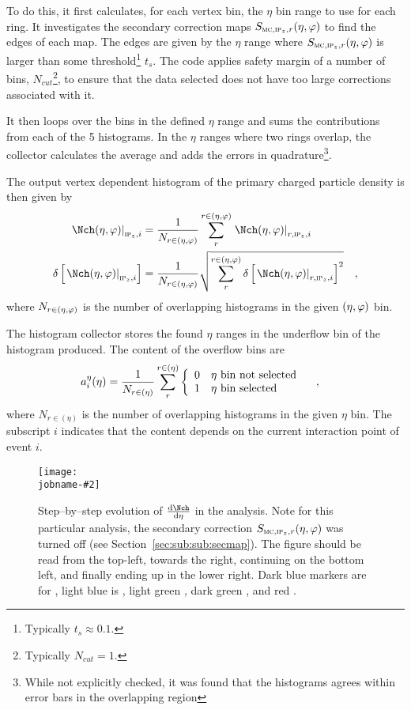 \documentclass[compat,11pt]{alicenote}
\newcommand*{\etaphi}{\ensuremath(\eta,\varphi)}
\newcommand*\SecMap{\ensuremath S_{\subMC,\subIPz,r}\etaphi}
\newcommand{\secref}[1]{Section~\ref{#1}}
\newcommand{\dndetadphi}[1][]{{\ensuremath%
    \ifx|#1|\else\left.\fi%
      \Nch\etaphi%
      \ifx|#1|\else\right|_{#1}\fi}}
\newcommand{\etaCov}{\ensuremath a_i^{\eta}(\eta)}
\newcommand\figinput[2][\textwidth]{%
  \texttt{[image: \\jobname-\#2]}}
\begin{document}
To do this, it first calculates, for each vertex bin, the $\eta$ bin
range to use for each ring.  It investigates the secondary correction
maps $\SecMap{}$ to find the edges of each map.  The edges are given
by the $\eta$ range where $\SecMap{}$ is larger than some
threshold\footnote{Typically $t_s\approx 0.1$.}  $t_s$. The code
applies safety margin of a number of bins,
$N_{cut}$\footnote{Typically $N_{cut}=1$.}, to ensure that the data
selected does not have too large corrections associated with it.

It then loops over the bins in the defined $\eta$ range and sums the
contributions from each of the 5 histograms.  In the $\eta$ ranges
where two rings overlap, the collector calculates the average and adds
the errors in quadrature\footnote{While not explicitly checked, it was
  found that the histograms agrees within error bars in the
  overlapping region}.

The output vertex dependent histogram of the primary
charged particle density is then given by
\begin{align}
  \label{eq:superhist}
  \dndetadphi[\subIPz,i] &=
  \frac{1}{N_{r\in\etaphi}}\sum_{r}^{r\in\etaphi}  
  \dndetadphi[r,\subIPz,i]\\
  \delta\left[\dndetadphi[\subIPz,i]\right] &=
  \frac{1}{N_{r\in\etaphi}}\sqrt{\sum_{r}^{r\in\etaphi}   
    \delta\left[\dndetadphi[r,\subIPz,i]\right]^2}
  \quad,
\end{align}
where $N_{r\in\etaphi}$ is the number of overlapping histograms
in the given $\etaphi$ bin. 

The histogram collector stores the found $\eta$ ranges in the
underflow bin of the histogram produced.  The content of the overflow
bins are 
\begin{align}
  \label{eq:overflow}
  \etaCov &= 
  \frac{1}{N_{r\in(\eta)}}
  \sum_{r}^{r\in(\eta)} \left\{\begin{array}{cl} 
      0 & \eta \text{\ bin not selected}\\ 
      1 & \eta \text{\ bin selected}
      \end{array}\right.\quad,
\end{align}
where $N_{r\in(\eta)}$ is the number of overlapping histograms in the
given $\eta$ bin.  The subscript $i$ indicates that the content
depends on the current interaction point of event $i$.

\begin{figure}[]
  \centering
  \figinput[.9\textwidth]{steps}
  \caption{Step--by--step evolution of $\dndeta$ in the analysis.
    Note for this particular analysis, the secondary correction
    $\SecMap{}$ was turned off (see \secref{sec:sub:sub:secmap}). The
    figure should be read from the top-left, towards the right,
    continuing on the bottom left, and finally ending up in the lower
    right. Dark blue markers are for , light blue is
    , light green , dark green , and red
    .}
  \label{fig:steps}
\end{figure} 
\end{document}
